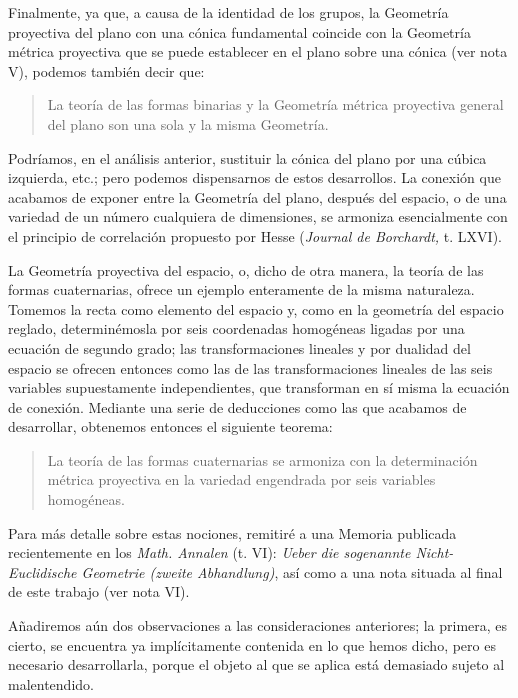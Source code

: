 \documentclass[a4paper, 12pt]{article}
\begin{document}
Finalmente, ya que, a causa de la identidad de los grupos, la Geometría proyectiva del plano con una cónica fundamental coincide con la Geometría métrica proyectiva que se puede establecer en el plano sobre una cónica (ver nota V), podemos también decir que:

\begin{quote}\it 

La teoría de las formas binarias y la Geometría métrica proyectiva general del plano son una sola y la misma Geometría.

\end{quote}

Podríamos, en el análisis anterior, sustituir la cónica del plano por una cúbica izquierda, etc.; pero podemos dispensarnos de estos desarrollos. La conexión que acabamos de exponer entre la Geometría del plano, después del espacio, o de una variedad de un número cualquiera de dimensiones, se armoniza esencialmente con el principio de correlación propuesto por Hesse (\textit{Journal de Borchardt, }t. LXVI).

La Geometría proyectiva del espacio, o, dicho de otra manera, la teoría de las formas cuaternarias, ofrece un ejemplo enteramente de la misma naturaleza. Tomemos la recta como elemento del espacio y, como en la geometría del espacio reglado, determinémosla por seis coordenadas homogéneas ligadas por una ecuación de segundo grado; las transformaciones lineales y por dualidad del espacio se ofrecen entonces como las de las transformaciones lineales de las seis variables supuestamente independientes, que transforman en sí misma la ecuación de conexión. Mediante una serie de deducciones como las que acabamos de desarrollar, obtenemos entonces el siguiente teorema:

\begin{quote}\it 

La teoría de las formas cuaternarias se armoniza con la determinación métrica proyectiva en la variedad engendrada por seis variables homogéneas.

\end{quote}

Para más detalle sobre estas nociones, remitiré a una Memoria publicada recientemente en los \textit{Math. Annalen }(t. VI): \textit{Ueber die sogenannte Nicht-Euclidische Geometrie (zweite Abhandlung)}, así como a una nota situada al final de este trabajo (ver nota VI).

Añadiremos aún dos observaciones a las consideraciones anteriores; la primera, es cierto, se encuentra ya implícitamente contenida en lo que hemos dicho, pero es necesario desarrollarla, porque el objeto al que se aplica está demasiado sujeto al malentendido.
\end{document}
